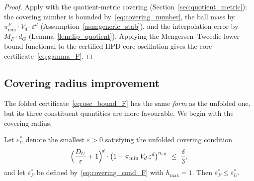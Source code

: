 \begin{proof}
  Apply \citet[Theorem~5.1]{LCNF} with the quotient-metric covering
  (Section~\ref{sec:quotient_metric}): the covering
  number is bounded by~\eqref{eq:covering_number}, the ball mass by
  $\pi_{\min}^F \cdot V_d \cdot \varepsilon^d$
  (Assumption~\ref{asm:generic_stab}), and the interpolation error by
  $M_F \cdot d_G$ (Lemma~\ref{lem:lip_quotient}).
  Applying the Mengersen--Tweedie lower-bound functional
  \citep{MengersenTweedie1996} to the certified HPD-core
  oscillation gives the core certificate~\eqref{eq:gamma_F}.
\end{proof}


\subsection{Covering radius improvement}
\label{sec:covering_improvement}

The folded certificate~\eqref{eq:osc_bound_F} has the same
\emph{form} as the unfolded one, but its three constituent
quantities are more favourable.  We begin with the covering
radius.

\begin{theorem}\label{thm:eps_improvement}
  Let $\varepsilon_U^*$ denote the smallest $\varepsilon > 0$
  satisfying the unfolded covering condition
  \begin{equation}\label{eq:covering_cond_U}
    \Bigl(\frac{D_U}{\varepsilon} + 1\Bigr)^{\!d}
    \cdot
    \bigl(1 - \pi_{\min}\, V_d\, \varepsilon^d\bigr)^{n_{\mathrm{eff}}}
    \;\leq\; \frac{\delta}{3},
  \end{equation}
  and let $\varepsilon_F^*$ be defined
  by~\eqref{eq:covering_cond_F} with $h_{\max} = 1$.  Then
  $\varepsilon_F^* \leq \varepsilon_U^*$.
\end{theorem}

